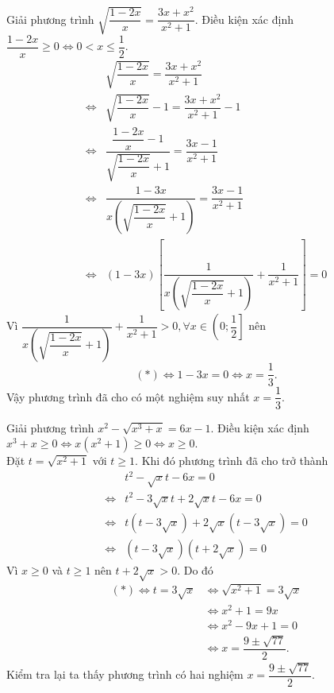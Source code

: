 \begin{bt}%
	Giải phương trình $\sqrt{\dfrac{1 - 2x}{x}} = \dfrac{3x + x^2}{x^2 + 1}$.
	\loigiai
	{
		Điều kiện xác định $\dfrac{1 - 2x}{x} \geq 0 \Leftrightarrow 0 < x \leq \dfrac{1}{2}$.
		\begin{align*}
		& \sqrt{\dfrac{1 - 2x}{x}} = \dfrac{3x + x^2}{x^2 + 1} \\
		\Leftrightarrow & \sqrt{\dfrac{1 - 2x}{x}} - 1 = \dfrac{3x + x^2}{x^2 + 1} - 1 \\
		\Leftrightarrow & \dfrac{\dfrac{1 - 2x}{x} - 1}{\sqrt{\dfrac{1 - 2x}{x}} + 1} = \dfrac{3x - 1}{x^2 + 1} \\
		\Leftrightarrow & \dfrac{1 - 3x}{x \left(\sqrt{\dfrac{1-2x}{x}} + 1 \right)} = \dfrac{3x - 1}{x^2 + 1} \\
		\Leftrightarrow & (1 - 3x)\left[\dfrac{1}{x \left( \sqrt{\dfrac{1 - 2x}{x}} + 1 \right)} + \dfrac{1}{x^2 + 1} \right] = 0 \tag{*}
		\end{align*}
		Vì $\dfrac{1}{x \left( \sqrt{\dfrac{1 - 2x}{x}} + 1 \right)} + \dfrac{1}{x^2 + 1} > 0, \forall x \in \left(0;\dfrac{1}{2} \right]$ nên
		$$(*) \Leftrightarrow 1 - 3x = 0 \Leftrightarrow x = \dfrac{1}{3}.$$
		Vậy phương trình đã cho có một nghiệm suy nhất $x = \dfrac{1}{3}$.
	}
\end{bt}


\begin{bt}%
	Giải phương trình $x^2 - \sqrt{x^3 + x} = 6x - 1$.
	\loigiai
	{
		Điều kiện xác định $x^3 + x \geq 0 \Leftrightarrow x(x^2 + 1) \geq 0 \Leftrightarrow x \geq 0$.\\
		Đặt $t = \sqrt{x^2 + 1}$ với $t \geq 1$. Khi đó phương trình đã cho trở thành
		\begin{align*}
		& t^2 - \sqrt{x}t - 6x = 0 \\
		\Leftrightarrow & t^2 - 3\sqrt{x}t + 2\sqrt{x}t - 6x = 0 \\
		\Leftrightarrow & t \left( t - 3\sqrt{x} \right) + 2\sqrt{x}\left( t - 3\sqrt{x} \right) = 0 \\
		\Leftrightarrow & \left( t - 3\sqrt{x} \right)\left( t + 2\sqrt{x} \right) = 0 \tag{*}
		\end{align*}
		Vì $x \geq 0$ và $t \geq 1$ nên $t + 2\sqrt{x} > 0$. Do đó
		\begin{align*}
		(*) \Leftrightarrow t = 3\sqrt{x} & \Leftrightarrow \sqrt{x^2 + 1} = 3\sqrt{x} \\
		& \Leftrightarrow x^2 + 1 = 9x \\
		& \Leftrightarrow x^2 - 9x + 1 = 0 \\
		& \Leftrightarrow x = \dfrac{9 \pm \sqrt{77}}{2}.
		\end{align*}
		Kiểm tra lại ta thấy phương trình có hai nghiệm $x = \dfrac{9 \pm \sqrt{77}}{2}$.
	}
\end{bt}


